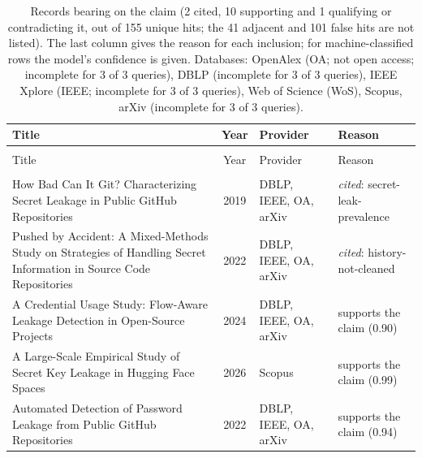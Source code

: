 
\begingroup\footnotesize
\begin{longtable}{@{}%
  >{\raggedright\arraybackslash}p{}c%
  >{\raggedright\arraybackslash}p{}%
  >{\raggedright\arraybackslash}p{}@{}}
\caption{Records bearing on the claim (2 cited, 10 supporting and 1 qualifying or contradicting it, out of 155 unique hits; the 41 adjacent and 101 false hits are not listed). The last column gives the reason for each inclusion; for machine-classified rows the model's confidence is given. Databases: OpenAlex (OA; not open access; incomplete for 3 of 3 queries), DBLP (incomplete for 3 of 3 queries), IEEE Xplore (IEEE; incomplete for 3 of 3 queries), Web of Science (WoS), Scopus, arXiv (incomplete for 3 of 3 queries).}\label{tab:t-secrets-leak}\\
\toprule
Title & Year & Provider & Reason \\
\midrule
\endfirsthead
\multicolumn{4}{@{}l}{\emph{\tablename~\thetable{} (cont.)}}\\
\toprule
Title & Year & Provider & Reason \\
\midrule
\endhead
\midrule \multicolumn{4}{r@{}}{\emph{continued on next page}}\\
\endfoot
\bottomrule
\endlastfoot
How Bad Can It Git? Characterizing Secret Leakage in Public GitHub Repositories & 2019 & DBLP, IEEE, OA, arXiv & \emph{cited}: secret-leak-prevalence \\
Pushed by Accident: A Mixed-Methods Study on Strategies of Handling Secret Information in Source Code Repositories & 2022 & DBLP, IEEE, OA, arXiv & \emph{cited}: history-not-cleaned \\
A Credential Usage Study: Flow-Aware Leakage Detection in Open-Source Projects & 2024 & DBLP, IEEE, OA, arXiv & supports the claim (0.90) \\
A Large-Scale Empirical Study of Secret Key Leakage in Hugging Face Spaces & 2026 & Scopus & supports the claim (0.99) \\
Automated Detection of Password Leakage from Public GitHub Repositories & 2022 & DBLP, IEEE, OA, arXiv & supports the claim (0.94) \\

\end{longtable}
